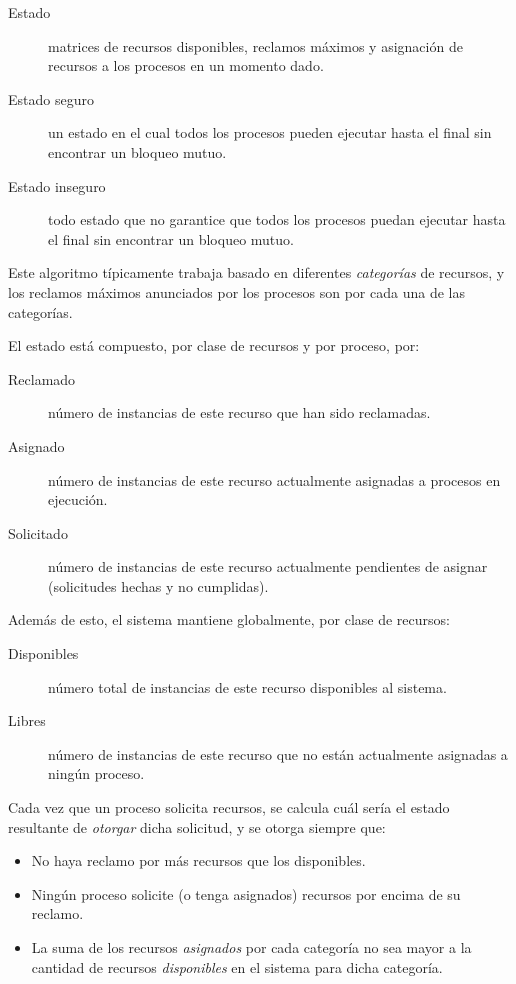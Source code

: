 \documentclass[11pt,fleqn]{book} %
\begin{document}
\begin{description}
\item[Estado] matrices de recursos disponibles, reclamos máximos y
            asignación de recursos a los procesos en un momento dado.
\item[Estado seguro] un estado en el cual todos los procesos pueden
                   ejecutar hasta el final sin encontrar un bloqueo
                   mutuo.
\item[Estado inseguro] todo estado que no garantice que todos los
     procesos puedan ejecutar hasta el final sin encontrar un bloqueo
     mutuo.
\end{description}

Este algoritmo típicamente trabaja basado en diferentes \emph{categorías} de
recursos, y los reclamos máximos anunciados por los procesos son por
cada una de las categorías.

El estado está compuesto, por clase de recursos y por proceso, por:

\begin{description}
\item[Reclamado] número de instancias de este recurso que han sido
               reclamadas.
\item[Asignado] número de instancias de este recurso actualmente
              asignadas a procesos en ejecución.
\item[Solicitado] número de instancias de este recurso actualmente
                pendientes de asignar (solicitudes hechas y no
                cumplidas).
\end{description}

Además de esto, el sistema mantiene globalmente, por clase de
recursos:

\begin{description}
\item[Disponibles] número total de instancias de este recurso
                 disponibles al sistema.
\item[Libres] número de instancias de este recurso que no están
            actualmente asignadas a ningún proceso.
\end{description}

Cada vez que un proceso solicita recursos, se calcula cuál sería el
estado resultante de \emph{otorgar} dicha solicitud, y se otorga siempre
que:

\begin{itemize}
\item No haya reclamo por más recursos que los disponibles.
\item Ningún proceso solicite (o tenga asignados) recursos por encima de
  su reclamo.
\item La suma de los recursos \emph{asignados} por cada categoría no sea mayor
  a la cantidad de recursos \emph{disponibles} en el sistema para dicha
  categoría.
\end{itemize}
\end{document}
